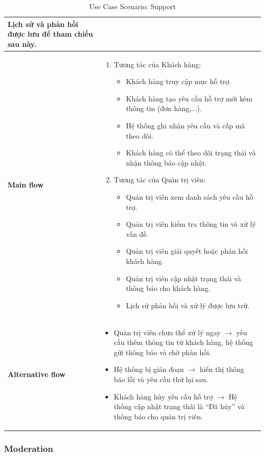 \documentclass{article}
\begin{document}
\begin{table}[h!]
\begin{table}[h!]
\begin{tabular}{p{3cm} p{11cm}}
    Lịch sử và phản hồi được lưu để tham chiếu sau này. \\ 
\hline
\vspace{0.025cm}
\textbf{Main flow} & 
\begin{enumerate}
    \item Tương tác của Khách hàng:
    \begin{itemize}
        \item Khách hàng truy cập mục hỗ trợ.
        \item Khách hàng tạo yêu cầu hỗ trợ mới kèm thông tin (đơn hàng,...).
        \item Hệ thống ghi nhận yêu cầu và cấp mã theo dõi.
        \item Khách hàng có thể theo dõi trạng thái và nhận thông báo cập nhật.
    \end{itemize}
    \item Tương tác của Quản trị viên:
    \begin{itemize}
        \item Quản trị viên xem danh sách yêu cầu hỗ trợ.
        \item Quản trị viên kiểm tra thông tin và xử lý vấn đề.
        \item Quản trị viên giải quyết hoặc phản hồi khách hàng.
        \item Quản trị viên cập nhật trạng thái và thông báo cho khách hàng.
        \item Lịch sử phản hồi và xử lý được lưu trữ.
    \end{itemize}
\end{enumerate} \\ 
\hline
\vspace{0.025cm}
\textbf{Alternative flow} & 
\begin{itemize}
    \item[1a.] Quản trị viên chưa thể xử lý ngay $\rightarrow$ yêu cầu thêm thông tin từ khách hàng, hệ thống gửi thông báo và chờ phản hồi.
    \item[2a.] Hệ thống bị gián đoạn $\rightarrow$ hiển thị thông báo lỗi và yêu cầu thử lại sau.
    \item[3a.] Khách hàng hủy yêu cầu hỗ trợ $\rightarrow$ Hệ thống cập nhật trạng thái là ``Đã hủy'' và thông báo cho quản trị viên.
\end{itemize} \\ 
\hline
\end{tabular}
\caption{Use Case Scenario: Support}
\end{table}
\newpage
\subsubsection{Moderation}

\end{table}
\end{document}
